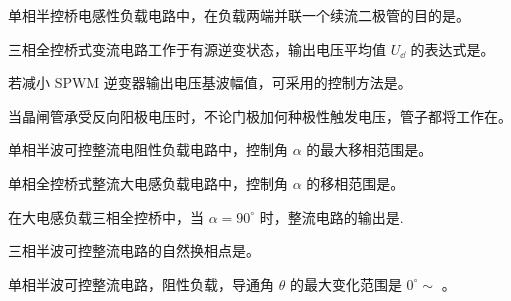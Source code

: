 \documentclass[电力电子]{subfiles}
\begin{document}
\begin{ti}
	单相半控桥电感性负载电路中，在负载两端并联一个续流二极管的目的是。
\end{ti}

\begin{ti}
	三相全控桥式变流电路工作于有源逆变状态，输出电压平均值 $U_{\dd}$ 的表达式是。
\end{ti}

\begin{ti}
	若减小 SPWM 逆变器输出电压基波幅值，可采用的控制方法是。
\end{ti}

\begin{ti}
	当晶闸管承受反向阳极电压时，不论门极加何种极性触发电压，管子都将工作在。
\end{ti}

\begin{ti}
	单相半波可控整流电阻性负载电路中，控制角 $\alpha$ 的最大移相范围是。
\end{ti}

\begin{ti}
	单相全控桥式整流大电感负载电路中，控制角 $\alpha$ 的移相范围是。
\end{ti}

\begin{ti}
	在大电感负载三相全控桥中，当 $\alpha = 90^\circ$ 时，整流电路的输出是.
\end{ti}

\begin{ti}
	三相半波可控整流电路的自然换相点是。
\end{ti}

\begin{ti}
	单相半波可控整流电路，阻性负载，导通角 $\theta$ 的最大变化范围是 $0^\circ \sim$ 。
\end{ti}
\end{document}
